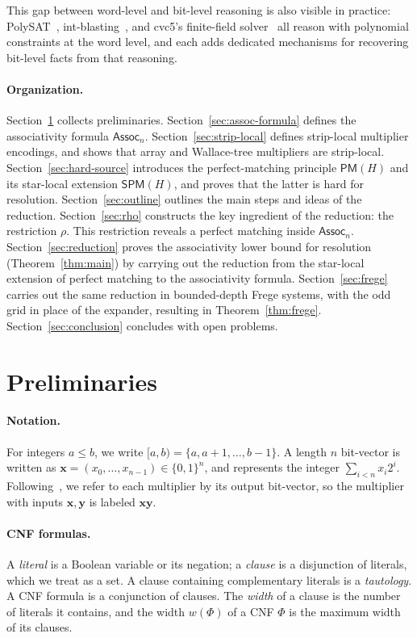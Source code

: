 \documentclass[11pt]{article}
\theoremstyle{definition}
\theoremstyle{remark}
\newcommand{\Assoc}{\mathsf{Assoc}}
\newcommand{\PM}{\mathsf{PM}}
\newcommand{\SPM}{\mathsf{SPM}}
\newcommand{\vv}[1]{\mathbf{#1}}
\begin{document}
This gap between word-level and bit-level reasoning is also visible in practice: PolySAT~\cite{polysat}, int-blasting~\cite{intblast}, and cvc5's finite-field solver~\cite{okt} all reason with polynomial constraints at the word level, and each adds dedicated mechanisms for recovering bit-level facts from that reasoning.


\paragraph{Organization.}
Section~\ref{sec:prelims} collects preliminaries. Section~\ref{sec:assoc-formula} defines the associativity formula $\Assoc_n$. Section~\ref{sec:strip-local} defines strip-local multiplier encodings, and shows that array and Wallace-tree multipliers are strip-local. Section~\ref{sec:hard-source} introduces the perfect-matching principle $\PM(H)$ and its star-local
extension $\SPM(H)$, and proves that the latter is hard for resolution. Section~\ref{sec:outline} outlines the main steps and
ideas of the reduction. Section~\ref{sec:rho} constructs the key ingredient of the reduction: the restriction $\rho$. This restriction reveals a perfect matching inside $\Assoc_n$. Section~\ref{sec:reduction} proves the associativity lower bound for resolution (Theorem~\ref{thm:main}) by carrying out the reduction from the star-local extension of perfect matching to the associativity formula. Section~\ref{sec:frege} carries out the same reduction in bounded-depth Frege systems, with the odd grid in place of the expander, resulting in Theorem~\ref{thm:frege}.
Section~\ref{sec:conclusion} concludes with open problems.


\section{Preliminaries}
\label{sec:prelims}

\paragraph{Notation.}
For integers $a\le b$, we write $[a,b)=\{a,a+1,\ldots,b-1\}$. A length $n$ bit-vector is written as
$\vv{x}=(x_0,\ldots,x_{n-1})\in\{0,1\}^n$, and represents the integer $\sum_{i<n}x_i2^i$. Following~\cite{beame-liew}, we refer to each multiplier by its output bit-vector, so the multiplier with inputs $\vv{x}, \vv{y}$ is labeled $\vv{x}\vv{y}$.

\paragraph{CNF formulas.}
A \emph{literal} is a Boolean variable or its negation; a \emph{clause} is a disjunction of literals, which we treat as a set. A clause containing complementary literals is a
\emph{tautology}. A CNF formula is a conjunction of clauses. The \emph{width} of a clause is the number of literals it contains, and the width $w(\Phi)$ of a CNF $\Phi$ is the maximum width of its clauses.
\end{document}
